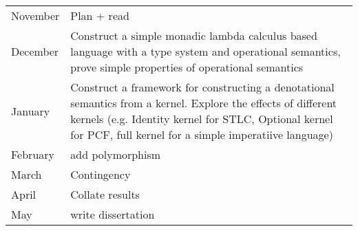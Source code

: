 \documentclass[11pt]{article}
\begin{document}
\begin{tabular}{|p{3cm}||p{12cm}|}
\hline
	November & Plan + read\\ 
	December & Construct a simple monadic lambda calculus based language with a type system and operational semantics, prove  simple properties of operational semantics \\
	January &  Construct a framework for constructing a denotational semantics from a kernel.
Explore the effects of different kernels (e.g. Identity kernel for STLC, Optional kernel for PCF, full kernel for a simple imperatiive language) \\
	February & add polymorphism \\
	March & Contingency \\
	April &  Collate results\\
	May & write dissertation \\ 
\hline
\end{tabular}

\newpage
\appendix
\end{document}
